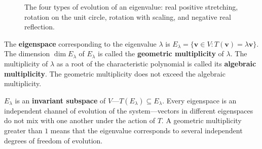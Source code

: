 \begin{figure}[htbp]
\centering
{}
\caption{The four types of evolution of an eigenvalue: real positive stretching, rotation on the unit circle, rotation with scaling, and negative real reflection.}
\label{fig:eigenvalue_motion_types}
\end{figure}

\begin{definition}\label{def:eigenspace}
The \textbf{eigenspace} corresponding to the eigenvalue $\lambda$ is $E_\lambda = \{\mathbf{v} \in V : T(\mathbf{v}) = \lambda \mathbf{v}\}$. The dimension $\dim E_\lambda$ of $E_\lambda$ is called the \textbf{geometric multiplicity} of $\lambda$. The multiplicity of $\lambda$ as a root of the characteristic polynomial is called its \textbf{algebraic multiplicity}. The geometric multiplicity does not exceed the algebraic multiplicity.

$E_\lambda$ is an \textbf{invariant subspace} of $V$---$T(E_\lambda) \subseteq E_\lambda$. Every eigenspace is an independent channel of evolution of the system---vectors in different eigenspaces do not mix with one another under the action of $T$. A geometric multiplicity greater than $1$ means that the eigenvalue corresponds to several independent degrees of freedom of evolution.
\end{definition}


